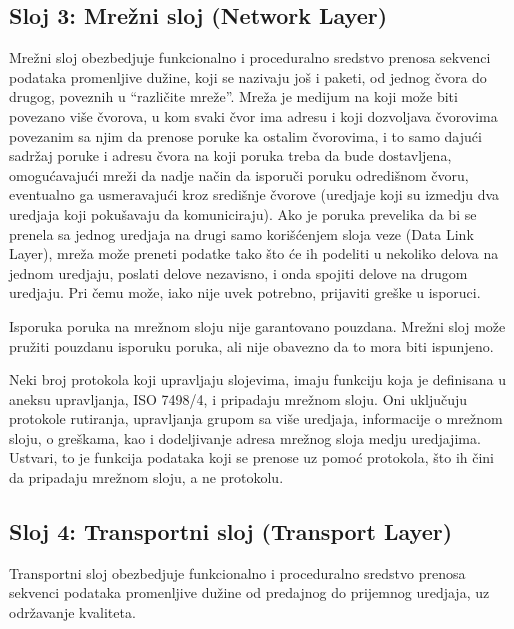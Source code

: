 \documentclass[a4paper,12pt, master]{etf}
\begin{document}
	\subsection{Sloj 3: Mre\v{z}ni sloj (Network Layer)}

	Mre\v{z}ni sloj obezbedjuje funkcionalno i proceduralno sredstvo prenosa
	sekvenci podataka promenljive du\v{z}ine, koji se nazivaju jo\v{s} i paketi,
	od jednog \v{c}vora do drugog, poveznih u ``razli\v{c}ite mre\v{z}e''.
	Mre\v{z}a je medijum na koji mo\v{z}e biti povezano vi\v{s}e \v{c}vorova, u
    kom svaki \v{c}vor ima adresu i koji dozvoljava \v{c}vorovima povezanim sa
    njim da prenose poruke ka ostalim \v{c}vorovima, i to samo daju\'{c}i
    sadr\v{z}aj poruke i adresu \v{c}vora na koji poruka treba da bude
    dostavljena, omogu\'{c}avaju\'{c}i mre\v{z}i da nadje na\v{c}in da isporu\v{c}i
    poruku odredi\v{s}nom \v{c}voru, eventualno ga usmeravaju\'{c}i kroz
    sredi\v{s}nje \v{c}vorove (uredjaje koji su izmedju dva uredjaja koji
    poku\v{s}avaju da komuniciraju). Ako je poruka prevelika da bi se prenela sa
    jednog uredjaja na drugi samo kori\v{s}\'{c}enjem sloja veze (Data Link
    Layer), mre\v{z}a mo\v{z}e preneti podatke tako \v{s}to \'{c}e ih podeliti
    u nekoliko delova na jednom uredjaju, poslati delove nezavisno, i onda
    spojiti delove na drugom uredjaju. Pri \v{c}emu mo\v{z}e, iako nije uvek
    potrebno, prijaviti gre\v{s}ke u isporuci.

	Isporuka poruka na mre\v{z}nom sloju nije garantovano pouzdana. Mre\v{z}ni
	sloj mo\v{z}e pru\v{z}iti pouzdanu isporuku poruka, ali nije obavezno da to
	mora biti ispunjeno.

	Neki broj protokola koji upravljaju slojevima, imaju funkciju koja je
	definisana u aneksu	upravljanja, ISO 7498/4, i pripadaju mre\v{z}nom sloju.
	Oni uklju\v{c}uju protokole rutiranja, upravljanja grupom sa vi\v{s}e
	uredjaja, informacije o mre\v{z}nom sloju, o gre\v{s}kama, kao i
	dodeljivanje adresa mre\v{z}nog sloja medju uredjajima. Ustvari, to je
	funkcija podataka koji se prenose uz pomo\'{c} protokola, \v{s}to ih
	\v{c}ini da pripadaju mre\v{z}nom sloju, a ne protokolu.

	\subsection{Sloj 4: Transportni sloj (Transport Layer)}

	Transportni sloj obezbedjuje funkcionalno i proceduralno sredstvo prenosa
	sekvenci podataka promenljive du\v{z}ine od predajnog do prijemnog uredjaja,
	 uz odr\v{z}avanje kvaliteta.
\end{document}
